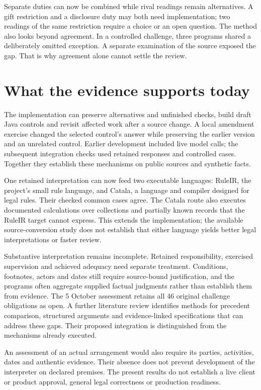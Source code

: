 \documentclass[12pt,a4paper,oneside,openany]{book}
\begin{document}
Separate duties can now be combined while rival readings remain alternatives.
A gift restriction and a disclosure duty may both need implementation; two
readings of the same restriction require a choice or an open question. The
method also looks beyond agreement. In a controlled challenge, three programs
shared a deliberately omitted exception. A separate examination of the source
exposed the gap. That is why agreement alone cannot settle the review.

\section*{What the evidence supports today}

The implementation can preserve alternatives and unfinished checks, build draft
Java controls and revisit affected work after a source change. A local amendment
exercise changed the selected control's answer while preserving the earlier
version and an unrelated control. Earlier development included live model calls;
the subsequent integration checks used retained responses and controlled cases.
Together they establish these mechanisms on public sources and synthetic facts.

One retained interpretation can now feed two executable languages: RuleIR, the
project's small rule language, and Catala, a language and compiler designed for
legal rules. Their checked common cases agree. The Catala route also executes
documented calculations over collections and partially known records that the
RuleIR target cannot express. This extends the implementation; the available
source-conversion study does not establish that either language yields better
legal interpretations or faster review.

Substantive interpretation remains incomplete. Retained responsibility,
exercised supervision and achieved adequacy need separate treatment. Conditions,
footnotes, actors and dates still require source-bound justification, and the
programs often aggregate supplied factual judgments rather than establish them
from evidence. The 5 October assessment retains all 46 original challenge
obligations as open. A further literature review identifies methods for
precedent comparison, structured arguments and evidence-linked specifications
that can address these gaps. Their proposed integration is distinguished from
the mechanisms already executed.

An assessment of an actual arrangement would also require its parties,
activities, dates and authentic evidence. Their absence does not prevent
development of the interpreter on declared premises. The present results do
not establish a live client or product approval, general legal correctness or
production readiness.
\end{document}
